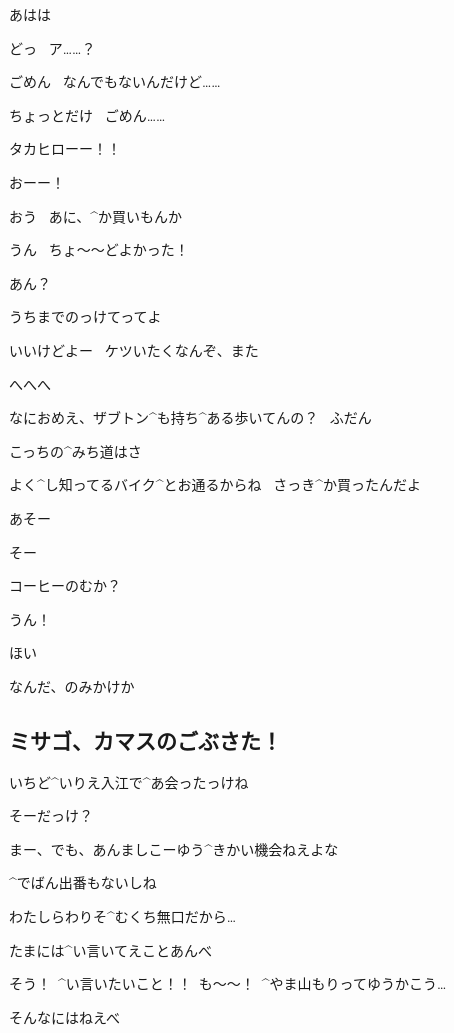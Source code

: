 \Takahiro あはは

\page[154]
\Takahiro どっ
\ ア……？

\page[155]
\Alpha ごめん
\ なんでもないんだけど……

\Alpha ちょっとだけ
\ ごめん……

\page[156]
\Makki タカヒローー！！

\page[157]
\Makki おーー！

\Takahiro おう
\ あに、^{か}{買}いもんか

\Makki うん
\ ちょ〜〜どよかった！

\Takahiro あん？

\Makki うちまでのっけてってよ

\page[158]
\Takahiro いいけどよー
\ ケツいたくなんぞ、また

\Makki へへへ

\Takahiro なにおめえ、ザブトン^{も}{持}ち^{ある}{歩}いてんの？
\ ふだん

\Makki こっちの^{みち}{道}はさ

\Makki よく^{し}{知}ってるバイク^{とお}{通}るからね
\ さっき^{か}{買}ったんだよ

\page[159]
\Takahiro あそー

\Makki そー

\Takahiro コーヒーのむか？

\Makki うん！

\page[160]
\Takahiro ほい

\Makki なんだ、のみかけか


\subsection{ミサゴ、カマスのごぶさた！}

 いちど^{いりえ}{入江}で^{あ}{会}ったっけね

 そーだっけ？

 まー、でも、あんましこーゆう^{きかい}{機会}ねえよな

 ^{でばん}{出番}もないしね

 わたしらわりそ^{むくち}{無口}だから…

 たまには^{い}{言}いてえことあんべ

 そう！\ ^{い}{言}いたいこと！！\ も〜〜！\ ^{やま}{山}もりってゆうかこう…

 そんなにはねえべ
